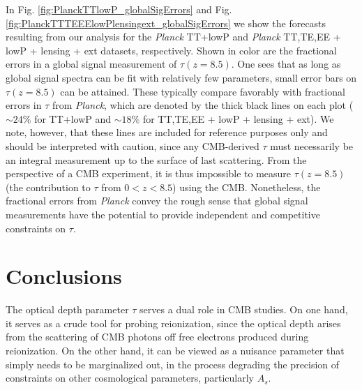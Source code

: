 \documentclass[twocolumn,aps,prd,nofootinbib,showpacs,superscriptaddress]{revtex4-1}
\begin{document}
In Fig. \ref{fig:PlanckTTlowP_globalSigErrors} and Fig. \ref{fig:PlanckTTTEEElowPlensingext_globalSigErrors} we show the forecasts resulting from our analysis for the \emph{Planck} TT+lowP and \emph{Planck} TT,TE,EE + lowP + lensing + ext  datasets, respectively. Shown in color are the fractional errors in a global signal measurement of $\tau (z=8.5)$. One sees that as long as global signal spectra can be fit with relatively few parameters, small error bars on $\tau(z = 8.5)$ can be attained. These typically compare favorably with fractional errors in $\tau$ from \emph{Planck}, which are denoted by the thick black lines on each plot ($\sim 24\%$ for TT+lowP and $\sim 18\%$ for TT,TE,EE + lowP + lensing + ext). We note, however, that these lines are included for reference purposes only and should be interpreted with caution, since any CMB-derived $\tau$ must necessarily be an integral measurement up to the surface of last scattering. From the perspective of a CMB experiment, it is thus impossible to measure $\tau (z=8.5)$ (the contribution to $\tau$ from $0 < z < 8.5$) using the CMB. Nonetheless, the fractional errors from \emph{Planck} convey the rough sense that global signal measurements have the potential to provide independent and competitive constraints on $\tau$.


\section{Conclusions}
\label{sec:conc}

The optical depth parameter $\tau$ serves a dual role in CMB studies. On one hand, it serves as a crude tool for probing reionization, since the optical depth arises from the scattering of CMB photons off free electrons produced during reionization. On the other hand, it can be viewed as a nuisance parameter that simply needs to be marginalized out, in the process degrading the precision of constraints on other cosmological parameters, particularly $A_s$.
\end{document}
